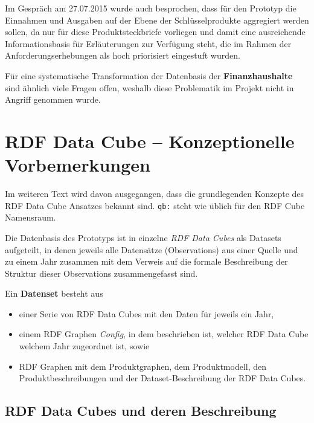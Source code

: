 \documentclass[a4paper,11pt,twoside]{article}
\begin{document}
Im Gespräch am 27.07.2015 wurde auch besprochen, dass für den Prototyp die
Einnahmen und Ausgaben auf der Ebene der Schlüsselprodukte aggregiert werden
sollen, da nur für diese Produktsteckbriefe vorliegen und damit eine
ausreichende Informationsbasis für Erläuterungen zur Verfügung steht, die im
Rahmen der Anforderungserhebungen als hoch priorisiert eingestuft wurden. 

Für eine systematische Transformation der Datenbasis der
\textbf{Finanzhaushalte} sind ähnlich viele Fragen offen, weshalb diese
Problematik im Projekt nicht in Angriff genommen wurde.

\section{RDF Data Cube -- Konzeptionelle Vorbemerkungen}

Im weiteren Text wird davon ausgegangen, dass die grundlegenden Konzepte des
RDF Data Cube Ansatzes \cite{RDF-Cube} bekannt sind.  \texttt{qb:} steht wie
üblich für den RDF Cube Namensraum.

Die Datenbasis des Prototyps ist in einzelne \emph{RDF Data Cubes} als Datasets
aufgeteilt, in denen jeweils alle Datensätze (Observations) aus einer Quelle
und zu einem Jahr zusammen mit dem Verweis auf die formale Beschreibung der
Struktur dieser Observations zusammengefasst sind.

Ein \textbf{Datenset} besteht aus
\begin{itemize}\itemsep0pt
\item einer Serie von RDF Data Cubes mit den Daten für jeweils ein Jahr,
\item einem RDF Graphen \emph{Config}, in dem beschrieben ist, welcher RDF Data
  Cube welchem Jahr zugeordnet ist, sowie
\item RDF Graphen mit dem Produktgraphen, dem Produktmodell, den
  Produktbeschreibungen und der Dataset-Beschreibung der RDF Data Cubes.
\end{itemize}

\subsection{RDF Data Cubes und deren Beschreibung}
\end{document}
